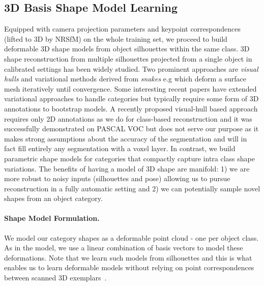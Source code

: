 \subsection{3D Basis Shape Model Learning}
Equipped with camera projection parameters and keypoint correspondences (lifted to 3D by NRSfM) on the whole training set, we proceed to build deformable 3D shape models from object silhouettes within the same class. 3D shape reconstruction from multiple silhouettes projected from a single object in calibrated settings has been widely studied. Two prominent approaches are \textit{visual hulls} \cite{laurentini1994hull} and variational methods derived from \textit{snakes} e.g \cite{esteban2004snake,yusuf2006snake} which deform a surface mesh iteratively until convergence. Some interesting recent papers have extended variational approaches to handle categories \cite{cashman2013dolphins,chen20123d} but typically require some form of 3D annotations to bootstrap models. A recently proposed visual-hull based approach \cite{carvi14} requires only 2D annotations as we do for class-based reconstruction and it was successfully demonstrated on PASCAL VOC but does not serve our purpose as it makes strong assumptions about the accuracy of the segmentation and will in fact fill entirely any segmentation with a voxel layer. In contrast, we build parametric shape models for categories that compactly capture intra class shape variations. The benefits of having a model of 3D shape are manifold: 1) we are more robust to noisy inputs (silhouettes and pose) allowing us to pursue reconstruction in a fully automatic setting and 2) we can potentially sample novel shapes from an object category.


\paragraph{Shape Model Formulation.} We model our category shapes as a deformable point cloud - one per object class. As in the \nrsfm model, we use a linear combination of basis vectors to model these deformations. Note that we learn such models from silhouettes and this is what enables us to learn deformable models without relying on point correspondences between scanned 3D exemplars~\cite{blanz2003face}.

